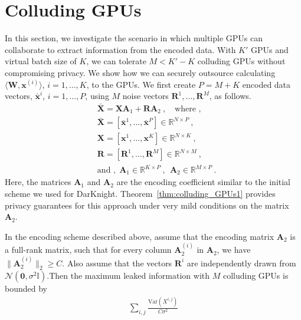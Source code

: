 \section{Colluding GPUs}
\label{ap:collude}
In this section, we investigate the scenario in which multiple GPUs can collaborate to extract information from the encoded data. With $K'$ GPUs and virtual batch size of $K$, we can tolerate $M < K'-K$ colluding GPUs without compromising privacy. We show how we can securely outsource calculating $\langle\mathbf W,\mathbf x^{(i)}\rangle$, $i=1,\dots, K$, to the GPUs. We first create $P=M+K$ encoded data vectors, $\bar{\mathbf x}^i$, $i=1,\dots, P$, using $M$ noise vectors $\mathbf R^1,\dots,\mathbf R^M$, as follows.
\begin{align}
    &\bar{\mathbf X}=\mathbf X\mathbf A_1+\mathbf R\mathbf A_2~,\quad\text{where ,}\nonumber\\
    &\bar{\mathbf X}=\left[\bar{\mathbf x}^1,\dots,\bar{\mathbf x}^{P}\right]\in\mathbb R^{N\times P}~,\nonumber\\
    &{\mathbf X}=\left[{\mathbf x}^1,\dots,{\mathbf x}^K\right]\in\mathbb R^{N\times K}~,\nonumber\\
    &{\mathbf R}=\left[{\mathbf R}^1,\dots,{\mathbf R}^M\right]\in\mathbb R^{N\times M}~,\nonumber\\
    &\text{and ,}~~\mathbf A_1\in\mathbb R^{K\times P}~,~~\mathbf A_2\in\mathbb R^{M\times P}~.
\end{align}
Here, the matrices $\mathbf A_1$ and $\mathbf A_2$ are the encoding coefficient similar to the initial scheme we used for DarKnight. Theorem~\ref{thm:colluding_GPUs1} provides privacy guarantees for this approach under very mild conditions on the matrix $\mathbf A_2$.

\begin{thm}\label{thm:colluding_GPUs1}
In the encoding scheme described above, assume that the encoding matrix $\mathbf A_2$ is a full-rank matrix, such that for every column $\mathbf A_2^{(i)}$ in $\mathbf A_2$, we have $\|\mathbf A_2^{(i)}\|_2\geq C$. Also assume that the vectors $\mathbf R^i$ are independently drawn from $\mathcal N(\mathbf 0,\sigma^2\mathbb I)$.Then the maximum leaked information with $M$ colluding GPUs is bounded by
\begin{align}
     \sum_{i,j}\frac{\text{Var}(X^{i,j})}{C\sigma^2}
\end{align}
\end{thm}

